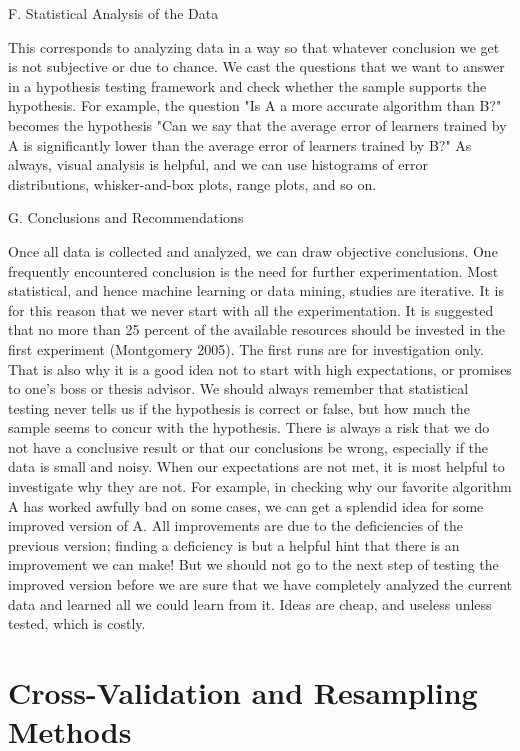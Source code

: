 F. Statistical Analysis of the Data

This corresponds to analyzing data in a way so that whatever conclusion we get is not subjective or due to chance. We cast the questions that we want to answer in a hypothesis testing framework and check whether the sample supports the hypothesis. For example, the question "Is A a more accurate algorithm than B?" becomes the hypothesis "Can we say that the average error of learners trained by A is significantly lower than the average error of learners trained by B?" As always, visual analysis is helpful, and we can use histograms of error distributions, whisker-and-box plots, range plots, and so on.

G. Conclusions and Recommendations

Once all data is collected and analyzed, we can draw objective conclusions. One frequently encountered conclusion is the need for further experimentation. Most statistical, and hence machine learning or data mining, studies are iterative. It is for this reason that we never start with all the experimentation. It is suggested that no more than 25 percent of the available resources should be invested in the first experiment (Montgomery 2005). The first runs are for investigation only. That is also why it is a good idea not to start with high expectations, or promises to one’s boss or thesis advisor. We should always remember that statistical testing never tells us if the hypothesis is correct or false, but how much the sample seems to concur with the hypothesis. There is always a risk that we do not have a conclusive result or that our conclusions be wrong, especially if the data is small and noisy. When our expectations are not met, it is most helpful to investigate why they are not. For example, in checking why our favorite algorithm A has worked awfully bad on some cases, we can get a splendid idea for some improved version of A. All improvements are due to the deficiencies of the previous version; finding a deficiency is but a helpful hint that there is an improvement we can make! But we should not go to the next step of testing the improved version before we are sure that we have completely analyzed the current data and learned all we could learn from it. Ideas are cheap, and useless unless tested, which is costly.

\section{Cross-Validation and Resampling Methods}


